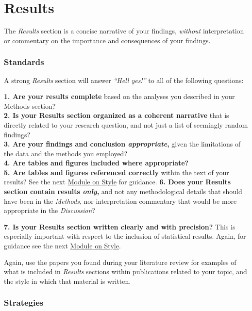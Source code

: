 \documentclass[
]{book}
\begin{document}
\hypertarget{results}{%
\section*{Results}\label{results}}

The \emph{Results} section is a concise narrative of your findings, \emph{without} interpretation or commentary on the importance and consequences of your findings.

\hypertarget{standards-3}{%
\subsubsection*{Standards}\label{standards-3}}

A strong \emph{Results} section will answer \emph{``Hell yes!''} to all of the following questions:

\textbf{1. Are your results complete} based on the analyses you described in your Methods section?\\
\textbf{2. Is your Results section organized as a coherent narrative} that is directly related to your research question, and not just a list of seemingly random findings?\\
\textbf{3. Are your findings and conclusion \emph{appropriate},} given the limitations of the data and the methods you employed?\\
\textbf{4. Are tables and figures included where appropriate?}\\
\textbf{5. Are tables and figures referenced correctly} within the text of your results? See the next \protect\hyperlink{style}{Module on Style} for guidance.
\textbf{6. Does your Results section contain results \emph{only},} and not any methodological details that should have been in the \emph{Methods}, nor interpretation commentary that would be more appropriate in the \emph{Discussion}?

\textbf{7. Is your Results section written clearly and with precision?} This is especially important with respect to the inclusion of statistical results. Again, for guidance see the next \protect\hyperlink{style}{Module on Style}.

Again, use the papers you found during your literature review for examples of what is included in \emph{Results} sections within publications related to your topic, and the style in which that material is written.

\hypertarget{strategies-3}{%
\subsubsection*{Strategies}\label{strategies-3}}
\end{document}
